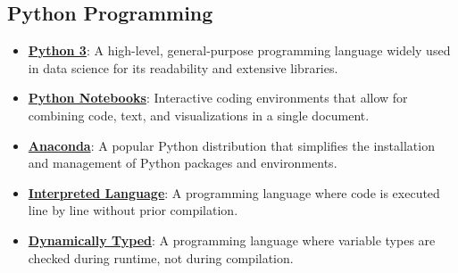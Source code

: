 \documentclass{article}%
\begin{document}
%
\subsection{Python Programming}%
\label{subsec:PythonProgramming}%
\begin{itemize}[leftmargin=*]%
\item \href{https://purdue.brightspace.com/d2l/common/assets/pdfjs-d2l-dist/1.0.14-legacy/web/viewer.html?file=\%2Fcontent\%2Fenforced\%2F1095465-WL.202510.CS24200.LE1\%2F02L1-python.pdf\%3Fou\%3D1095465\&lang=en-us\&container=d2l-fileviewer-rendered-pdf\&fullscreen=d2l-fileviewer-rendered-pdf-dialog\&height=667#page=3}{\textbf{Python 3}}: A high-level, general-purpose programming language widely used in data science for its readability and extensive libraries.%
\item \href{https://purdue.brightspace.com/d2l/common/assets/pdfjs-d2l-dist/1.0.14-legacy/web/viewer.html?file=\%2Fcontent\%2Fenforced\%2F1095465-WL.202510.CS24200.LE1\%2F02L1-python.pdf\%3Fou\%3D1095465\&lang=en-us\&container=d2l-fileviewer-rendered-pdf\&fullscreen=d2l-fileviewer-rendered-pdf-dialog\&height=667#page=5}{\textbf{Python Notebooks}}: Interactive coding environments that allow for combining code, text, and visualizations in a single document.%
\item \href{https://purdue.brightspace.com/d2l/common/assets/pdfjs-d2l-dist/1.0.14-legacy/web/viewer.html?file=\%2Fcontent\%2Fenforced\%2F1095465-WL.202510.CS24200.LE1\%2F02L1-python.pdf\%3Fou\%3D1095465\&lang=en-us\&container=d2l-fileviewer-rendered-pdf\&fullscreen=d2l-fileviewer-rendered-pdf-dialog\&height=667#page=4}{\textbf{Anaconda}}: A popular Python distribution that simplifies the installation and management of Python packages and environments.%
\item \href{https://purdue.brightspace.com/d2l/common/assets/pdfjs-d2l-dist/1.0.14-legacy/web/viewer.html?file=\%2Fcontent\%2Fenforced\%2F1095465-WL.202510.CS24200.LE1\%2F02L1-python.pdf\%3Fou\%3D1095465\&lang=en-us\&container=d2l-fileviewer-rendered-pdf\&fullscreen=d2l-fileviewer-rendered-pdf-dialog\&height=667#page=6}{\textbf{Interpreted Language}}: A programming language where code is executed line by line without prior compilation.%
\item \href{https://purdue.brightspace.com/d2l/common/assets/pdfjs-d2l-dist/1.0.14-legacy/web/viewer.html?file=\%2Fcontent\%2Fenforced\%2F1095465-WL.202510.CS24200.LE1\%2F02L1-python.pdf\%3Fou\%3D1095465\&lang=en-us\&container=d2l-fileviewer-rendered-pdf\&fullscreen=d2l-fileviewer-rendered-pdf-dialog\&height=667#page=6}{\textbf{Dynamically Typed}}: A programming language where variable types are checked during runtime, not during compilation.%

\end{itemize}
\end{document}
